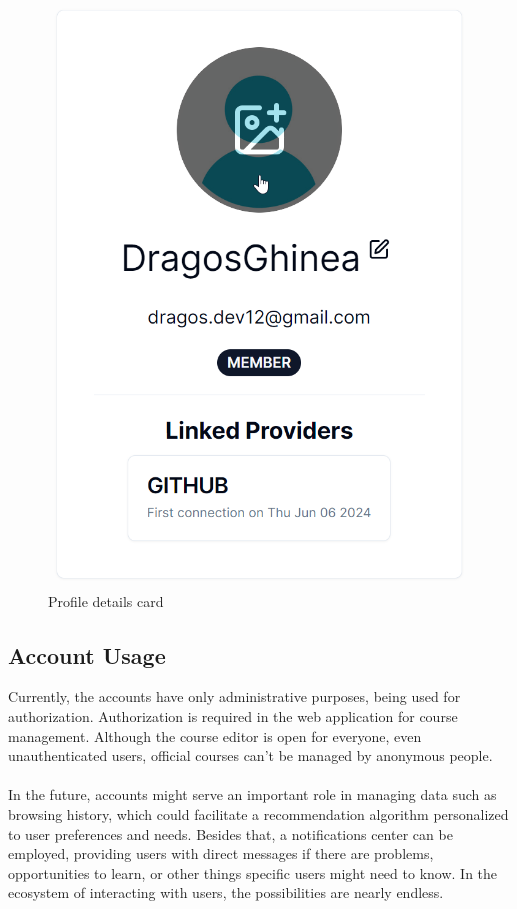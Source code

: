 \begin{figure}[h]
    \centering
    \includegraphics[scale=0.7]{images/profile-card.png}
    \caption{Profile details card}
    \label{fig:profile-card}
\end{figure}

\subsection{Account Usage}

\noindent Currently, the accounts have only administrative purposes, being used for authorization. Authorization is required in the web application for course management. Although the course editor is open for everyone, even unauthenticated users, official courses can't be managed by anonymous people.
\\\\
\noindent In the future, accounts might serve an important role in managing data such as browsing history, which could facilitate a recommendation algorithm personalized to user preferences and needs. Besides that, a notifications center can be employed, providing users with direct messages if there are problems, opportunities to learn, or other things specific users might need to know. In the ecosystem of interacting with users, the possibilities are nearly endless.

